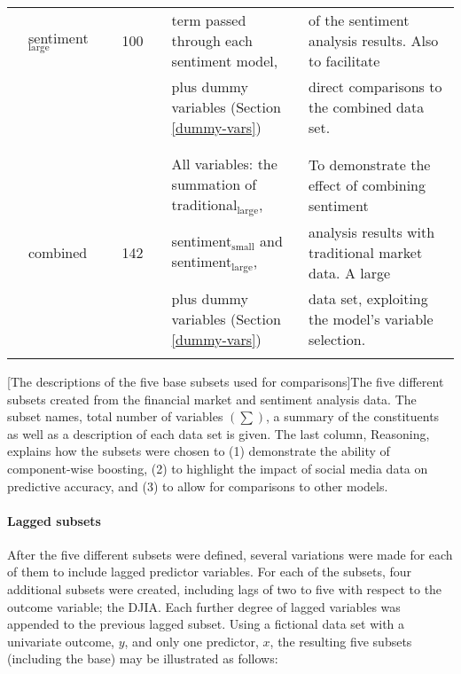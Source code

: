 \documentclass{article}
\begin{document}
\begin{landscape}
\begin{center}
\begin{tabular}{lllclll}
 & sentiment$_{\text{large}}$ &  & 100 &  & term passed through each sentiment model, & of the sentiment analysis results. Also to facilitate\\
 &  &  &  &  & plus dummy variables (Section \ref{dummy-vars}) & direct comparisons to the combined data set.\\
 &  &  &  &  &  & \\
\hline
 &  &  &  &  &  & \\
 &  &  &  &  & All variables: the summation of traditional$_{\text{large}}$, & To demonstrate the effect of combining sentiment\\
 & combined &  & 142 &  & sentiment$_{\text{small}}$ and sentiment$_{\text{large}}$, & analysis results with traditional market data. A large\\
 &  &  &  &  & plus dummy variables (Section \ref{dummy-vars}) & data set, exploiting the model's variable selection.\\
 &  &  &  &  &  & \\
\hline
\end{tabular}
\end{center}

[The descriptions of the five base subsets used for comparisons]{The five different subsets created from the financial market and sentiment analysis data. The subset names, total number of variables $\left( \sum \right)$, a summary of the constituents as well as a description of each data set is given. The last column, Reasoning, explains how the subsets were chosen to (1) demonstrate the ability of component-wise boosting, (2) to highlight the impact of social media data on predictive accuracy, and (3) to allow for comparisons to other models.}\label{tab_subsets}
\end{landscape}
\clearpage


\paragraph{Lagged subsets \label{lagged-subsets}}
\label{sec-1-2-4-1}

After the five different subsets were defined, several variations were made for each of them to include lagged predictor variables. For each of the subsets, four additional subsets were created, including lags of two to five with respect to the outcome variable; the DJIA. Each further degree of lagged variables was appended to the previous lagged subset. Using a fictional data set with a univariate outcome, $y$, and only one predictor, $x$, the resulting five subsets (including the base) may be illustrated as follows:
\end{document}
